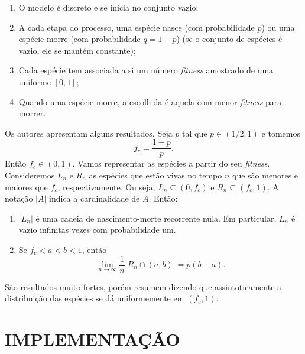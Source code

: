 \documentclass[10pt,brazil,english]{article}
\begin{document}
        \renewcommand{\theenumi}{\roman{enumi}} 
        \begin{enumerate}
            \item O modelo é discreto e se inicia no conjunto vazio;
            \item A cada etapa do processo, uma espécie nasce (com probabilidade $p$) ou uma espécie morre (com probabilidade $q = 1 - p$) (se o conjunto de espécies é vazio, ele se mantém constante);
            \item Cada espécie tem associada a si um número \textit{fitness} amostrado de uma uniforme $[0, 1]$;
            \item Quando uma espécie morre, a escolhida é aquela com menor \textit{fitness} para morrer.
        \end{enumerate}

        Os autores apresentam alguns resultados. Seja $p$ tal que $p \in (1/2, 1)$ e tomemos $$f_c = \frac{1 - p}{p}\textrm{.}$$
        Então $f_c \in (0, 1)$.
        Vamos representar as espécies a partir do seu \textit{fitness}.
        Consideremos $L_n$ e $R_n$ as espécies que estão vivas no tempo $n$ que são menores e maiores que $f_c$, respectivamente. Ou seja, $L_n \subseteq (0, f_c)$ e $R_n \subseteq (f_c, 1)$. A notação $|A|$ indica a cardinalidade de $A$. Então:

        \begin{theorem} \cite{guiol2009stochastic}
            \label{theorem1}
            \renewcommand{\theenumi}{\alph{enumi}} 
            \begin{enumerate}
                \item $|L_n|$ é uma cadeia de nascimento-morte recorrente nula. Em particular, $L_n$ é vazio infinitas vezes com probabilidade um.
                \item Se $f_c < a < b < 1$, então $$\lim_{n \to \infty} \dfrac{1}{n} |R_n \cap (a, b)| = p(b - a) \textrm{.}$$
            \end{enumerate}
        \end{theorem}

        São resultados muito fortes, porém  resumem dizendo que assintoticamente a distribuição das espécies se dá uniformemente em $(f_c, 1)$.

    \section{IMPLEMENTAÇÃO}
\end{document}
